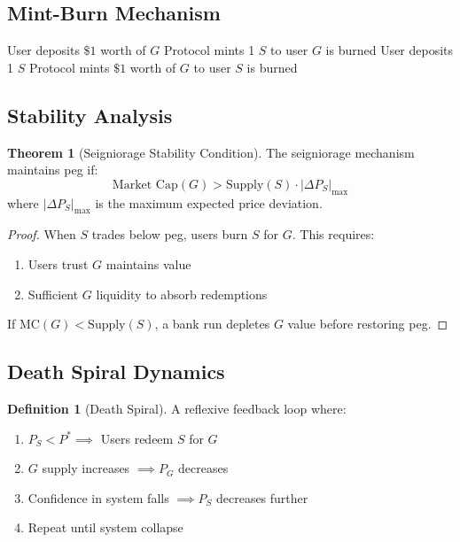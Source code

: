 \documentclass[11pt,a4paper]{article}
\theoremstyle{definition}
\newtheorem{definition}{Definition}
\newtheorem{theorem}{Theorem}
\begin{document}
\subsection{Mint-Burn Mechanism}

\begin{algorithm}
\caption{Seigniorage Mint/Burn}
\begin{algorithmic}[1]
 
\State User deposits $\$1$ worth of $G$
\State Protocol mints 1 $S$ to user
\State $G$ is burned
 
\State User deposits 1 $S$
\State Protocol mints $\$1$ worth of $G$ to user
\State $S$ is burned
\EndIf
\end{algorithmic}
\end{algorithm}

\subsection{Stability Analysis}

\begin{theorem}[Seigniorage Stability Condition]
The seigniorage mechanism maintains peg if:
\begin{equation}
\text{Market Cap}(G) > \text{Supply}(S) \cdot |\Delta P_S|_{\max}
\end{equation}
where $|\Delta P_S|_{\max}$ is the maximum expected price deviation.
\end{theorem}

\begin{proof}
When $S$ trades below peg, users burn $S$ for $G$. This requires:
\begin{enumerate}
\item Users trust $G$ maintains value
\item Sufficient $G$ liquidity to absorb redemptions
\end{enumerate}
If $\text{MC}(G) < \text{Supply}(S)$, a bank run depletes $G$ value before restoring peg.
\end{proof}

\subsection{Death Spiral Dynamics}

\begin{definition}[Death Spiral]
A reflexive feedback loop where:
\begin{enumerate}
\item $P_S < P^* \implies$ Users redeem $S$ for $G$
\item $G$ supply increases $\implies P_G$ decreases
\item Confidence in system falls $\implies P_S$ decreases further
\item Repeat until system collapse
\end{enumerate}
\end{definition}
\end{document}
